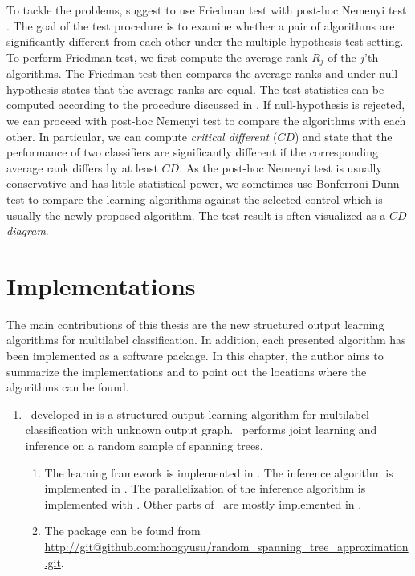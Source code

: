 {To tackle the problems, \citet{Demsar06statistical} suggest to use Friedman test \citep{Friedman37the,Friedman40Comparison} with post-hoc Nemenyi test \citep{Nemenyi63distribution}.
The goal of the test procedure is to examine whether a pair of algorithms are significantly different from each other under the multiple hypothesis test setting.
To perform Friedman test, we first compute the average rank $R_j$ of the $j$'th algorithms.
The Friedman test then compares the average ranks and under null-hypothesis states that the average ranks are equal.
The test statistics can be computed according to the procedure discussed in \citep{Demsar06statistical}.
If null-hypothesis is rejected, we can proceed with post-hoc Nemenyi test to compare the algorithms with each other.
In particular, we can compute \textit{critical different} ($CD$) and state that the performance of two classifiers are significantly different if the corresponding average rank differs by at least $CD$.
As the post-hoc Nemenyi test is usually conservative and has little statistical power, we sometimes use Bonferroni-Dunn test \citep{Dunn61mulitple} to compare the learning algorithms against the selected control which is usually the newly proposed algorithm.
The test result is often visualized as a \textit{$CD$ diagram}.
\fi








%
%
\chapter{Implementations} \label{ch_implementation}

The main contributions of this thesis are the new structured output learning algorithms for multilabel classification.
In addition, each presented algorithm has been implemented as a software package.
In this chapter, the author aims to summarize the implementations and to point out the locations where the algorithms can be found.

\begin{enumerate}
	\item \rta\ developed in  is a structured output learning algorithm for multilabel classification with unknown output graph. \rta\ performs joint learning and inference on a random sample of spanning trees.
	\begin{enumerate}
		\item The learning framework is implemented in \matlab. The inference algorithm is implemented in \cpp. The parallelization of the inference algorithm is implemented with \openmp. Other parts of \rta\ are mostly implemented in \matlab.
		\item The package can be found from \url{http://git@github.com:hongyusu/random_spanning_tree_approximation.git}.
	\end{enumerate}
	

\end{enumerate}}
